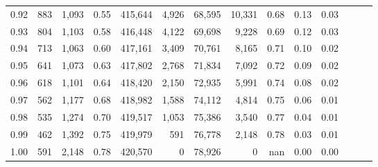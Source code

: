 \begin{tabular}{rrrrrrrrrrrrrr}
0.92 &    883 &  1,093 &  0.55 &  415,644 &    4,926 &  68,595 &  10,331 &  0.68 &  0.13 &      0.03 \\
0.93 &    804 &  1,103 &  0.58 &  416,448 &    4,122 &  69,698 &   9,228 &  0.69 &  0.12 &      0.03 \\
0.94 &    713 &  1,063 &  0.60 &  417,161 &    3,409 &  70,761 &   8,165 &  0.71 &  0.10 &      0.02 \\
0.95 &    641 &  1,073 &  0.63 &  417,802 &    2,768 &  71,834 &   7,092 &  0.72 &  0.09 &      0.02 \\
0.96 &    618 &  1,101 &  0.64 &  418,420 &    2,150 &  72,935 &   5,991 &  0.74 &  0.08 &      0.02 \\
0.97 &    562 &  1,177 &  0.68 &  418,982 &    1,588 &  74,112 &   4,814 &  0.75 &  0.06 &      0.01 \\
0.98 &    535 &  1,274 &  0.70 &  419,517 &    1,053 &  75,386 &   3,540 &  0.77 &  0.04 &      0.01 \\
0.99 &    462 &  1,392 &  0.75 &  419,979 &      591 &  76,778 &   2,148 &  0.78 &  0.03 &      0.01 \\
1.00 &    591 &  2,148 &  0.78 &  420,570 &        0 &  78,926 &       0 &   nan &  0.00 &      0.00 \\
\bottomrule
\end{tabular}
